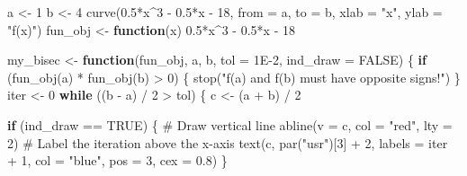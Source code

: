 \documentclass[
  letterpaper,
  DIV=11,
  numbers=noendperiod]{scrreprt}
\newenvironment{Shaded}{\begin{snugshade}}{\end{snugshade}}
\newcommand{\AttributeTok}[1]{\textcolor[rgb]{0.40,0.45,0.13}{#1}}
\newcommand{\CommentTok}[1]{\textcolor[rgb]{0.37,0.37,0.37}{#1}}
\newcommand{\ConstantTok}[1]{\textcolor[rgb]{0.56,0.35,0.01}{#1}}
\newcommand{\ControlFlowTok}[1]{\textcolor[rgb]{0.00,0.23,0.31}{\textbf{#1}}}
\newcommand{\DecValTok}[1]{\textcolor[rgb]{0.68,0.00,0.00}{#1}}
\newcommand{\FloatTok}[1]{\textcolor[rgb]{0.68,0.00,0.00}{#1}}
\newcommand{\FunctionTok}[1]{\textcolor[rgb]{0.28,0.35,0.67}{#1}}
\newcommand{\NormalTok}[1]{\textcolor[rgb]{0.00,0.23,0.31}{#1}}
\newcommand{\OtherTok}[1]{\textcolor[rgb]{0.00,0.23,0.31}{#1}}
\newcommand{\SpecialCharTok}[1]{\textcolor[rgb]{0.37,0.37,0.37}{#1}}
\newcommand{\StringTok}[1]{\textcolor[rgb]{0.13,0.47,0.30}{#1}}
\begin{document}
\begin{Shaded}
\begin{Highlighting}[]
\NormalTok{a }\OtherTok{\textless{}{-}} \DecValTok{1}
\NormalTok{b }\OtherTok{\textless{}{-}} \DecValTok{4}
\FunctionTok{curve}\NormalTok{(}\FloatTok{0.5}\SpecialCharTok{*}\NormalTok{x}\SpecialCharTok{\^{}}\DecValTok{3} \SpecialCharTok{{-}} \FloatTok{0.5}\SpecialCharTok{*}\NormalTok{x }\SpecialCharTok{{-}} \DecValTok{18}\NormalTok{, }\AttributeTok{from =}\NormalTok{ a, }\AttributeTok{to =}\NormalTok{ b, }\AttributeTok{xlab =} \StringTok{"x"}\NormalTok{, }\AttributeTok{ylab =} \StringTok{"f(x)"}\NormalTok{)}
\NormalTok{fun\_obj }\OtherTok{\textless{}{-}} \ControlFlowTok{function}\NormalTok{(x) }\FloatTok{0.5}\SpecialCharTok{*}\NormalTok{x}\SpecialCharTok{\^{}}\DecValTok{3} \SpecialCharTok{{-}} \FloatTok{0.5}\SpecialCharTok{*}\NormalTok{x }\SpecialCharTok{{-}} \DecValTok{18}

\NormalTok{my\_bisec }\OtherTok{\textless{}{-}} \ControlFlowTok{function}\NormalTok{(fun\_obj, a, b, }\AttributeTok{tol =} \FloatTok{1E{-}2}\NormalTok{, }\AttributeTok{ind\_draw =} \ConstantTok{FALSE}\NormalTok{) \{}
  \ControlFlowTok{if}\NormalTok{ (}\FunctionTok{fun\_obj}\NormalTok{(a) }\SpecialCharTok{*} \FunctionTok{fun\_obj}\NormalTok{(b) }\SpecialCharTok{\textgreater{}} \DecValTok{0}\NormalTok{) \{}
    \FunctionTok{stop}\NormalTok{(}\StringTok{"f(a) and f(b) must have opposite signs!"}\NormalTok{)}
\NormalTok{  \}}
\NormalTok{  iter }\OtherTok{\textless{}{-}} \DecValTok{0}
  \ControlFlowTok{while}\NormalTok{ ((b }\SpecialCharTok{{-}}\NormalTok{ a) }\SpecialCharTok{/} \DecValTok{2} \SpecialCharTok{\textgreater{}}\NormalTok{ tol) \{}
\NormalTok{    c }\OtherTok{\textless{}{-}}\NormalTok{ (a }\SpecialCharTok{+}\NormalTok{ b) }\SpecialCharTok{/} \DecValTok{2}
    
    \ControlFlowTok{if}\NormalTok{ (ind\_draw }\SpecialCharTok{==} \ConstantTok{TRUE}\NormalTok{) \{}
    \CommentTok{\# Draw vertical line}
    \FunctionTok{abline}\NormalTok{(}\AttributeTok{v =}\NormalTok{ c, }\AttributeTok{col =} \StringTok{"red"}\NormalTok{, }\AttributeTok{lty =} \DecValTok{2}\NormalTok{)}
    \CommentTok{\# Label the iteration above the x{-}axis}
    \FunctionTok{text}\NormalTok{(c, }\FunctionTok{par}\NormalTok{(}\StringTok{"usr"}\NormalTok{)[}\DecValTok{3}\NormalTok{] }\SpecialCharTok{+} \DecValTok{2}\NormalTok{, }\AttributeTok{labels =}\NormalTok{ iter }\SpecialCharTok{+} \DecValTok{1}\NormalTok{, }\AttributeTok{col =} \StringTok{"blue"}\NormalTok{, }\AttributeTok{pos =} \DecValTok{3}\NormalTok{, }\AttributeTok{cex =} \FloatTok{0.8}\NormalTok{)}
\NormalTok{    \}}


\end{Highlighting}
\end{Shaded}
\end{document}

